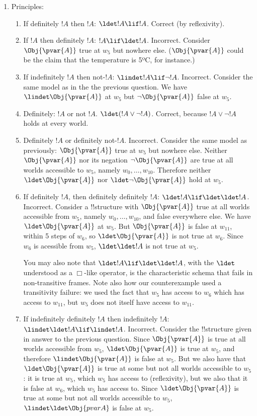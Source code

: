 \documentclass[../../../../include/open-logic-section]{subfiles}
\begin{document}
\begin{prob}
\begin{ans}
\begin{enumerate}
	\item Principles:
		\begin{enumerate}
			\item If definitely $!A$ then $!A$: $\ldet !A\lif!A$. Correct
			(by reflexivity).
			\item If $!A$ then definitely $!A$: $!A \lif \ldet!A$.
			Incorrect. Consider $\Obj{\pvar{A}}$ true at $w_5$ but 
			nowhere else. ($\Obj{\pvar{A}}$ could be the claim that the 
			temperature is 5ºC, for instance.)
			\item If indefinitely $!A$ then not-$!A$: $\lindet!A \lif
			\lnot!A$. Incorrect. Consider the same model as in the 
			the previous question. We have $\lindet\Obj{\pvar{A}}$
			at $w_5$ but $\lnot\Obj{\pvar{A}}$ false at $w_5$.
			\item Definitely: $!A$ or not $!A$. $\ldet(!A\lor\lnot!A)$. 
			Correct, because $!A\lor\lnot!A$ holds at every world.
			\item Definitely $!A$ or definitely not-$!A$. Incorrect. 
			Consider the same model as previously: $\Obj{\pvar{A}}$ 
			true at $w_5$ but nowhere else. Neither $\Obj{\pvar{A}}$ 
			nor its negation $\lnot\Obj{\pvar{A}}$ are true at all 
			worlds accessible to $w_5$, namely $w_0,\ldots,w_{10}$. 
			Therefore neither $\ldet\Obj{\pvar{A}}$ nor $\ldet\lnot\Obj{\pvar{A}}$
			hold at $w_5$. 
			\item If definitely $!A$, then definitely definitely $!A$: 
			$\ldet!A\lif\ldet\ldet!A$.
			Incorrect. Consider a !!{structure} with $\Obj{\pvar{A}}$ true 
			at all worlds accessible from $w_5$, namely $w_0,\ldots,w_{10}$,
			and false everywhere else. We have $\ldet\Obj{\pvar{A}}$ at
			$w_5$. But $\Obj{\pvar{A}}$ is false at $w_{11}$, within
			5 steps of $w_6$, so $\ldet\Obj{\pvar{A}}$ is not true at 
			$w_6$. Since $w_6$ is acessible from $w_5$, $\ldet\ldet!A$
			is not true at $w_5$. 
			
			You may also note that $\ldet!A\lif\ldet\ldet!A$, 
			with the $\ldet$ understood as a $\Box$-like operator, is 
			the characteristic schema  that fails in non-transitive frames.
			Note also how our counterexample used a transitivity failure:
			we used the fact that $w_5$ has access to $w_6$ which has 
			access to $w_{11}$, but $w_5$ does not itself have access
			to $w_{11}$.

			\item If indefinitely definitely $!A$ then indefinitely $!A$:
			$\lindet\ldet!A\lif\lindet!A$. Incorrect. Consider the 
			!!{structure} given in answer to the previous question. 
			Since $\Obj{\pvar{A}}$ is true at all worlds accessible 
			from $w_5$, $\ldet\Obj{\pvar{A}}$ is true at $w_5$, 
			and therefore $\lindet\Obj{\pvar{A}}$ is false at $w_5$.
			But we also have that $\ldet\Obj{\pvar{A}}$ is true at 
			some but not all worlds accessible to $w_5$: it is true 
			at $w_5$, which $w_5$ has access to (reflexivity), but we 
			also that it is false at $w_6$, which $w_5$ has access to.
			Since $\ldet\Obj{\pvar{A}}$ is true at 
			some but not all worlds accessible to $w_5$, 
			$\lindet\ldet\Obj{pvar{A}}$ is false at $w_5$.


\end{enumerate}
\end{enumerate}
\end{ans}
\end{prob}
\end{document}
